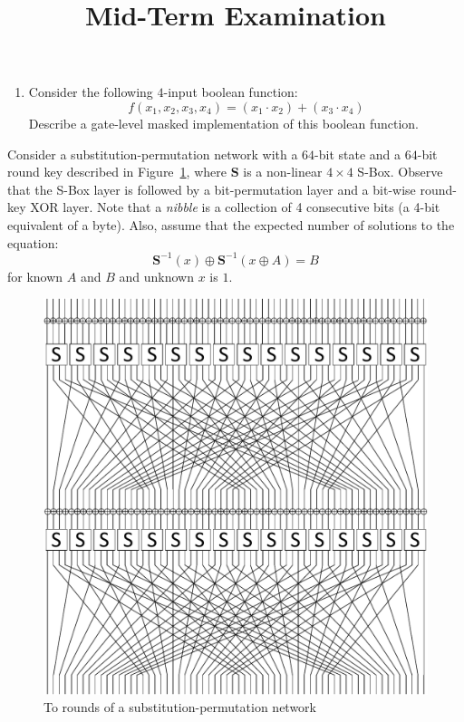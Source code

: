 \documentclass{article}
\title{Mid-Term Examination}
\begin{document}
\begin{questions}

\question 

\begin{enumerate}
 \item Consider the following $4$-input boolean function:
\begin{equation}
 f\left(x_1,x_2,x_3,x_4\right) = \left(x_1 \cdot x_2\right) + \left(x_3 \cdot x_4\right)\nonumber
\end{equation}
\noindent Describe a gate-level masked implementation of this boolean function.
\end{enumerate}





\question 

Consider a substitution-permutation network with a $64$-bit state and a $64$-bit round key described in Figure~\ref{fig:present_structure}, where $\mathrm{\mathbf{S}}$ is a non-linear $4\times 4$ S-Box. Observe that the S-Box layer is followed by a bit-permutation layer and a bit-wise round-key XOR layer. Note that a \emph{nibble} is a collection of 4 consecutive bits (a 4-bit equivalent of a byte). Also, assume that the expected number of solutions to the equation:
\begin{equation}
 \mathrm{\mathbf{S}}^{-1}\left(x\right) \oplus \mathrm{\mathbf{S}}^{-1}\left(x\oplus A\right) = B\nonumber
\end{equation}
\noindent for known $A$ and $B$ and unknown $x$ is $1$.

\begin{figure}[h]
	\centering
	\includegraphics[scale=0.3]{present_structure.pdf}
    \caption{To rounds of a substitution-permutation network}
    \label{fig:present_structure}
\end{figure}



\end{questions}
\end{document}
